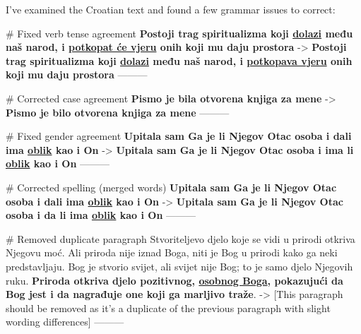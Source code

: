 I've examined the Croatian text and found a few grammar issues to correct:

# Fixed verb tense agreement
\textbf{Postoji trag spiritualizma koji \underline{dolazi} među naš narod, i \underline{potkopat će vjeru} onih koji mu daju prostora}
->
\textbf{Postoji trag spiritualizma koji \underline{dolazi} među naš narod, i \underline{potkopava vjeru} onih koji mu daju prostora}
---------

# Corrected case agreement
\textbf{Pismo je bila otvorena knjiga za mene}
->
\textbf{Pismo je bilo otvorena knjiga za mene}
---------

# Fixed gender agreement
\textbf{Upitala sam Ga je li Njegov Otac osoba i dali ima \underline{oblik} kao i On}
->
\textbf{Upitala sam Ga je li Njegov Otac osoba i ima li \underline{oblik} kao i On}
---------

# Corrected spelling (merged words)
\textbf{Upitala sam Ga je li Njegov Otac osoba i dali ima \underline{oblik} kao i On}
->
\textbf{Upitala sam Ga je li Njegov Otac osoba i da li ima \underline{oblik} kao i On}
---------

# Removed duplicate paragraph
Stvoriteljevo djelo koje se vidi u prirodi otkriva Njegovu moć. Ali priroda nije iznad Boga, niti je Bog u prirodi kako ga neki predstavljaju. Bog je stvorio svijet, ali svijet nije Bog; to je samo djelo Njegovih ruku. \textbf{Priroda otkriva djelo pozitivnog, \underline{osobnog Boga}, pokazujući da Bog jest i da nagrađuje one koji ga marljivo traže}.
->
[This paragraph should be removed as it's a duplicate of the previous paragraph with slight wording differences]
---------